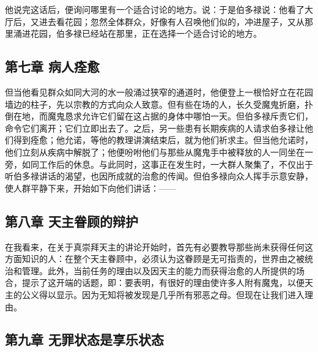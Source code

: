 他说完这话后，便询问哪里有一个适合讨论的地方。说：于是伯多禄说：他看了大厅后，又进去看花园；忽然全体群众，好像有人召唤他们似的，冲进屋子，又从那里涌进花园，伯多禄已经站在那里，正在选择一个适合讨论的地方。\par


\subsection{第七章 病人痊愈}

但当他看见群众如同大河的水一般涌过狭窄的通道时，他便登上一根恰好立在花园墙边的柱子，先以宗教的方式向众人致意。但有些在场的人，长久受魔鬼折磨，扑倒在地，而魔鬼恳求允许它们留在这占据的身体中哪怕一天。但伯多禄斥责它们，命令它们离开；它们立即出去了。之后，另一些患有长期疾病的人请求伯多禄让他们得到痊愈；他允诺，等他的教理讲演结束后，就为他们祈求主。但当他允诺时，他们立刻从疾病中解脱了；他便吩咐他们与那些从魔鬼手中被释放的人一同坐在一旁，如同工作后的休息。与此同时，这事正在发生时，一大群人聚集了，不仅出于听伯多禄讲话的渴望，也因所成就的治愈的传闻。但伯多禄向众人挥手示意安静，使人群平静下来，开始如下向他们讲话：——\par


\subsection{第八章 天主眷顾的辩护}

在我看来，在关于真崇拜天主的讲论开始时，首先有必要教导那些尚未获得任何这方面知识的人：在整个天主眷顾中，必须认为这眷顾是无可指责的，世界由之被统治和管理。此外，当前任务的理由以及因天主的能力而获得治愈的人所提供的场合，提示了这开端的话题，即：要表明，有很好的理由使许多人附有魔鬼，以便天主的公义得以显示。因为无知将被发现是几乎所有邪恶之母。但现在让我们进入理由。\par


\subsection{第九章 无罪状态是享乐状态}

